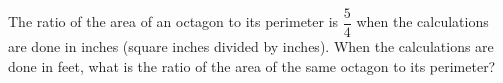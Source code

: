 The ratio of the area of an octagon to its perimeter is $\dfrac{5}{4}$ when the calculations are done in inches (square inches divided by inches). When the calculations are done in feet, what is the ratio of the area of the same octagon to its perimeter?
